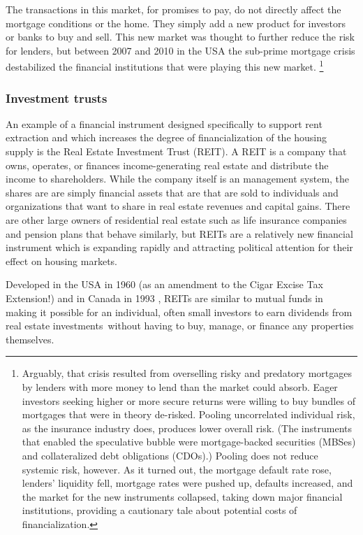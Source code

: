 The transactions in this market, for promises to pay, do not directly affect the mortgage conditions or the home. They simply add a new product for investors or banks to buy and sell. This new market was thought to further reduce the risk for lenders, but between 2007 and 2010 in the USA the sub-prime mortgage crisis destabilized the financial institutions that were playing this new market. \footnote{Arguably, that crisis resulted from overselling risky and predatory mortgages by lenders with more money to lend than the market could absorb. Eager investors seeking higher or more secure returns were willing  to buy bundles of  mortgages that were in theory de-risked. Pooling uncorrelated individual risk, as the insurance industry does, produces lower overall risk. (The instruments that enabled the speculative bubble were mortgage-backed securities (MBSes) and collateralized debt obligations (CDOs).) Pooling does not reduce systemic risk, however. As it turned out, the mortgage default rate rose, lenders' liquidity fell, mortgage rates were pushed up, defaults increased, and the market for the new instruments collapsed, taking down major financial institutions, providing a cautionary tale about potential costs of financialization.} %

\subsubsection{Investment trusts}
An example of a financial instrument designed specifically to support rent extraction and which increases the degree of financialization of the housing supply is the Real Estate Investment Trust (\gls{REIT}).  A REIT is a company that owns, operates, or finances income-generating real estate and distribute the income to shareholders. While the company itself is an management system, the shares are are simply financial assets that are that are sold to individuals and organizations that want to share in real estate revenues and capital gains. There are other large owners of residential real estate such as life insurance companies and pension plans that behave similarly, but REITs are a relatively new financial instrument which is  expanding rapidly and attracting political attention for their effect on housing markets.  %

Developed in the USA  in 1960 (as an amendment to the Cigar Excise Tax Extension!) and in Canada in 1993 \cite{GET_REITsDevelopedDates}, REITs are similar to mutual funds in making it possible for an individual, often small investors to earn dividends from real estate investments without having to buy, manage, or finance any properties themselves. 

